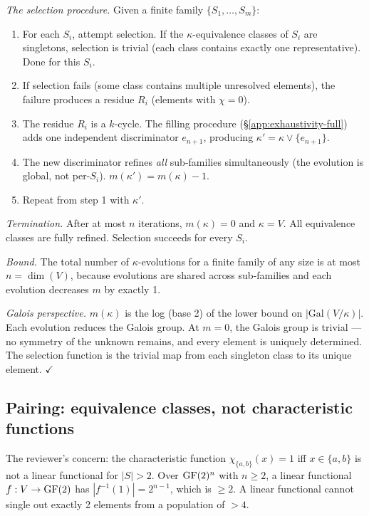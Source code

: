 \emph{The selection procedure.}
Given a finite family $\{S_1, \ldots, S_m\}$:
\begin{enumerate}[label=\arabic*.,nosep]
  \item For each $S_i$, attempt selection. If the
    $\kappa$-equivalence classes of $S_i$ are singletons,
    selection is trivial (each class contains exactly one
    representative). Done for this $S_i$.
  \item If selection fails (some class contains multiple
    unresolved elements), the failure produces a residue
    $R_i$ (elements with $\chi = 0$).
  \item The residue $R_i$ is a $k$-cycle. The filling
    procedure (\S\ref{app:exhaustivity-full}) adds one
    independent discriminator $e_{n+1}$, producing
    $\kappa' = \kappa \vee \{e_{n+1}\}$.
  \item The new discriminator refines \emph{all}
    sub-families simultaneously (the evolution is global,
    not per-$S_i$). $m(\kappa')= m(\kappa) - 1$.
  \item Repeat from step 1 with $\kappa'$.
\end{enumerate}

\emph{Termination.}
After at most $n$ iterations, $m(\kappa) = 0$ and
$\kappa = V$. All equivalence classes are fully refined.
Selection succeeds for every $S_i$.

\emph{Bound.} The total number of $\kappa$-evolutions
for a finite family of any size is at most $n = \dim(V)$,
because evolutions are shared across sub-families and
each evolution decreases $m$ by exactly 1.

\emph{Galois perspective.}
$m(\kappa)$ is the log (base 2) of the lower bound on
$|\mathrm{Gal}(V/\kappa)|$. Each evolution reduces the
Galois group. At $m = 0$, the Galois group is trivial
--- no symmetry of the unknown remains, and every
element is uniquely determined. The selection function
is the trivial map from each singleton class to its
unique element. $\checkmark$


\subsection{Pairing: equivalence classes, not characteristic
  functions}
\label{app:pairing-linearity}

The reviewer's concern: the characteristic function
$\chi_{\{a,b\}}(x) = 1$ iff $x \in \{a,b\}$ is not
a linear functional for $|S| > 2$. Over $\operatorname{GF}(2)^n$
with $n \geq 2$, a linear functional $f: V \to \operatorname{GF}(2)$
has $|f^{-1}(1)| = 2^{n-1}$, which is $\geq 2$. A
linear functional cannot single out exactly 2 elements
from a population of $> 4$.

